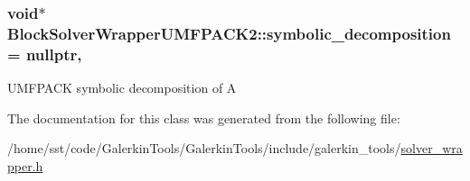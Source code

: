 \subsubsection[{\texorpdfstring{symbolic\+\_\+decomposition}{symbolic_decomposition}}]{\setlength{\rightskip}{0pt plus 5cm}void$\ast$ Block\+Solver\+Wrapper\+U\+M\+F\+P\+A\+C\+K2\+::symbolic\+\_\+decomposition = nullptr\hspace{0.3cm}{\ttfamily [mutable]}, {\ttfamily [private]}}\hypertarget{class_block_solver_wrapper_u_m_f_p_a_c_k2_a399387c1717404d92ed721fc31767f55}{}\label{class_block_solver_wrapper_u_m_f_p_a_c_k2_a399387c1717404d92ed721fc31767f55}
U\+M\+F\+P\+A\+CK symbolic decomposition of A 

The documentation for this class was generated from the following file\+:\begin{DoxyCompactItemize}
\item 
/home/sst/code/\+Galerkin\+Tools/\+Galerkin\+Tools/include/galerkin\+\_\+tools/\hyperlink{solver__wrapper_8h}{solver\+\_\+wrapper.\+h}\end{DoxyCompactItemize}
